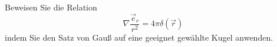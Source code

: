 \documentclass{atistandalonetask}
\begin{document}
  \begin{atiTask}[
    title = Eine häufig gebrauchte Erkenntnis
  ]
  
 Beweisen Sie die Relation
    \[
    \nabla \frac{\vec{e}_r}{r^2}=4\pi\delta(\vec{r})
    \]
    indem Sie den Satz von Gauß auf eine geeignet gewählte Kugel anwenden.
  \end{atiTask}
  \begin{atiSolution}

  	
  \end{atiSolution}
\end{document}

